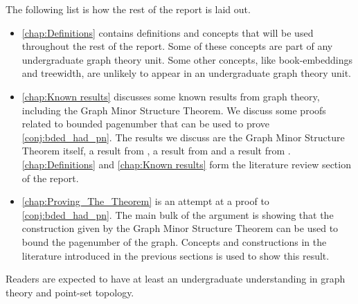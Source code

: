 The following list is how the rest of the report is laid out. 
\begin{itemize}
	\item \cref{chap:Definitions} contains definitions and concepts that will be used throughout the rest of the report. Some of these concepts are part of any undergraduate graph theory unit. Some other concepts, like book-embeddings and treewidth, are unlikely to appear in an undergraduate graph theory unit.
	\item \cref{chap:Known results} discusses some known results from graph theory, including the Graph Minor Structure Theorem. We discuss some proofs related to bounded pagenumber that can be used to prove \cref{conj:bded_had_pn}. The results we discuss are the Graph Minor Structure Theorem itself, a result from \textcite{heathPagenumberGenusGraphs1992}, a result from \textcite{ganleyPagenumberTrees2001} and a result from \textcite{hickingbothamStackNumberCliqueSum2023}. \cref{chap:Definitions} and \cref{chap:Known results} form the literature review section of the report.

	\item \cref{chap:Proving_The_Theorem} is an attempt at a proof to \cref{conj:bded_had_pn}. The main bulk of the argument is showing that the construction given by the Graph Minor Structure Theorem can be used to bound the pagenumber of the graph. Concepts and constructions in the literature introduced in the previous sections is used to show this result. 
\end{itemize}

Readers are expected to have at least an undergraduate understanding in graph theory and point-set topology. 

